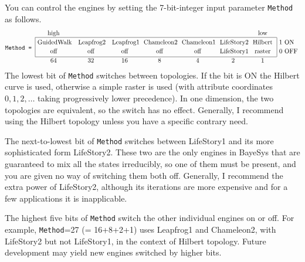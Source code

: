 You can control the engines by setting the 7-bit-integer input parameter {\tt Method} as follows.
$$
\hbox
{\vbox{\hbox{\tt Method = }\vskip 20pt}}
{\vbox{
 \offinterlineskip
 \halign{& \vrule# &\ \hfil#\hfil\ &\ \ \hfil#\hfil\ \ &\ \hfil#\hfil\ &\ \hfil#\hfil\ &\ \hfil#\hfil\ &\ \hfil#\hfil\ & \ \hfil#\hfil\ &\vrule# &\ #\hfil \strut\cr
                \omit   &  high    &         &          &          &          &          &   low   &\omit&        \cr
                                                  \multispan8\hrulefill                                           \cr
              height2pt & \omit    & \omit   & \omit    & \omit    & \omit    & \omit    & \omit   &     & \omit  \cr
                        &GuidedWalk&Leapfrog2& Leapfrog1&Chameleon2&Chameleon1&LifeStory2&Hilbert  &     &  1 ON  \cr
              height2pt & \omit    & \omit   & \omit    & \omit    & \omit    & \omit    & \omit   &     & \omit  \cr
                        &  off     &  off    &  off     &  off     &  off     &LifeStory1&raster   &     &  0 OFF \cr
              height2pt & \omit    & \omit   & \omit    & \omit    & \omit    & \omit    & \omit   &     & \omit  \cr
                                                  \multispan8\hrulefill                                           \cr
                 \omit  &  64      &  32     &  16      &   8      &   4      &   2      &   1     &\omit&        \cr
        }
      }
}
$$
The lowest bit of {\tt Method} switches between topologies.
If the bit is ON the Hilbert curve is used, otherwise a simple raster is used (with attribute coordinates $0,1,2,\ldots$ taking progressively lower precedence).
In one dimension, the two topologies are equivalent, so the switch has no effect.
Generally, I recommend using the Hilbert topology unless you have a specific contrary need.

The next-to-lowest bit of {\tt Method} switches between LifeStory1 and its more sophisticated form LifeStory2.
These two are the only engines in BayeSys that are guaranteed to mix all the states irreducibly, so one of them must be present, 
and you are given no way of switching them both off.
Generally, I recommend the extra power of LifeStory2, although its iterations are more expensive and for a few applications it is inapplicable.

The highest five bits of {\tt Method} switch the other individual engines on or off.
For example, {\tt Method}=27 (= 16+8+2+1) uses Leapfrog1 and Chameleon2, with LifeStory2 but not LifeStory1, in the context of Hilbert topology.
Future development may yield new engines switched by higher bits.

